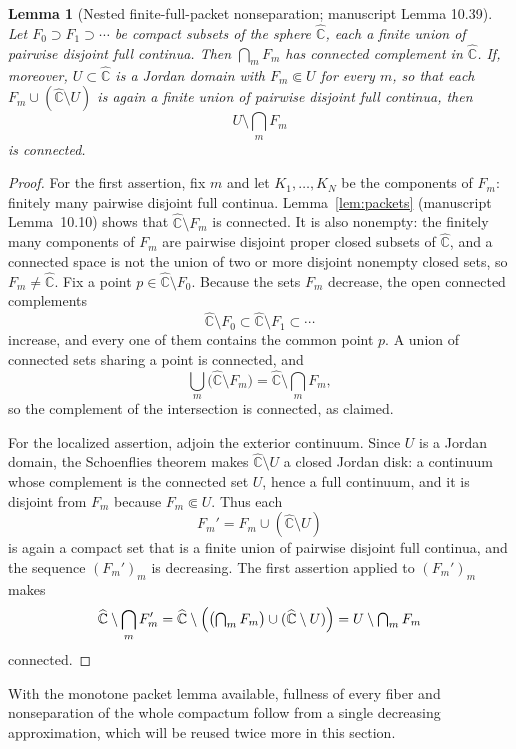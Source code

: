 \documentclass[11pt,reqno]{amsart}
\newtheorem{lemma}[theorem]{Lemma}
\theoremstyle{definition}
\theoremstyle{remark}
\newcommand{\Chat}{\widehat{\mathbb C}}
\begin{document}
\begin{lemma}[Nested finite-full-packet nonseparation; manuscript
Lemma 10.39]\label{lem:nested-packets}
Let $F_0\supset F_1\supset\cdots$ be compact subsets of the sphere
$\Chat$, each a finite union of pairwise disjoint full continua.  Then
$\bigcap_m F_m$ has connected complement in $\Chat$.  If, moreover,
$U\subset\Chat$ is a Jordan domain with $F_m\Subset U$ for every $m$, so
that each $F_m\cup(\Chat\setminus U)$ is again a finite union of pairwise
disjoint full continua, then
\[
U\setminus\bigcap_m F_m
\]
is connected.
\end{lemma}

\begin{proof}
For the first assertion, fix $m$ and let $K_1,\dots,K_N$ be the
components of $F_m$: finitely many pairwise disjoint full continua.
Lemma~\ref{lem:packets} (manuscript Lemma~10.10) shows that
$\Chat\setminus F_m$ is connected.  It is also nonempty: the finitely
many components of $F_m$ are pairwise disjoint proper closed subsets of
$\Chat$, and a connected space is not the union of two or more disjoint
nonempty closed sets, so $F_m\neq\Chat$.  Fix a point
$p\in\Chat\setminus F_0$.  Because the sets $F_m$ decrease, the open
connected complements
\[
\Chat\setminus F_0\subset\Chat\setminus F_1\subset\cdots
\]
increase, and every one of them contains the common point $p$.  A union
of connected sets sharing a point is connected, and
\[
\bigcup_m\bigl(\Chat\setminus F_m\bigr)
=\Chat\setminus\bigcap_m F_m ,
\]
so the complement of the intersection is connected, as claimed.

For the localized assertion, adjoin the exterior continuum.  Since $U$ is
a Jordan domain, the Schoenflies theorem \cite{New51} makes
$\Chat\setminus U$ a closed Jordan disk: a continuum whose complement is
the connected set $U$, hence a full continuum, and it is disjoint from
$F_m$ because $F_m\Subset U$.  Thus each
\[
F_m'=F_m\cup(\Chat\setminus U)
\]
is again a compact set that is a finite union of pairwise disjoint full
continua, and the sequence $(F_m')_m$ is decreasing.  The first assertion
applied to $(F_m')_m$ makes
\[
\Chat\setminus\bigcap_m F_m'
=\Chat\setminus\Bigl(\bigl(\textstyle\bigcap_m F_m\bigr)
\cup(\Chat\setminus U)\Bigr)
=U\setminus\bigcap_m F_m
\]
connected.
\end{proof}

With the monotone packet lemma available, fullness of every fiber and
nonseparation of the whole compactum follow from a single decreasing
approximation, which will be reused twice more in this section.
\end{document}
